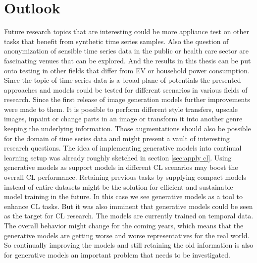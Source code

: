 \section*{Outlook}
Future research topics that are interesting could be more appliance test on other tasks that benefit from synthetic time series samples. 
Also the question of anonymization of sensible time series data in the public or health care sector are fascinating venues that can be explored. And the results in this thesis can be put onto testing in other fields that differ from EV or household power consumption. Since the topic of time series data is a broad plane of potentials the presented approaches and models could be tested for different scenarios in various fields of research. Since the first release of image generation models further improvements were made to them. It is possible to perform different style transfers, upscale images, inpaint or change parts in an image or transform it into another genre keeping the underlying information. Those augmentations should also be possible for the domain of time series data and might present a vault of interesting research questions.\newline
The idea of implementing generative models into continual learning setup was already roughly sketched in section \ref{sec:apply cl}. Using generative models as support models in different CL scenarios may boost the overall CL performance. Retaining previous tasks by supplying compact models instead of entire datasets might be the solution for efficient and sustainable model training in the future. In this case we see generative models as a tool to enhance CL tasks. But it was also imminent that generative models could be seen as the target for CL research. The models are currently trained on temporal data. The overall behavior might change for the coming years, which means that the generative models are getting worse and worse representatives for the real world. So continually improving the models and still retaining the old information is also for generative models an important problem that needs to be investigated.